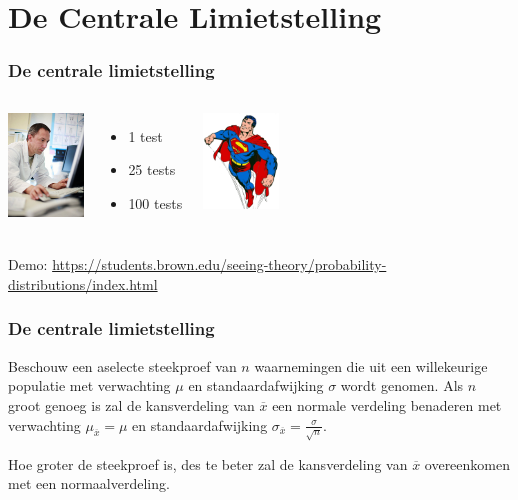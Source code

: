 \documentclass{beamer}
\begin{document}
\section{De Centrale Limietstelling}
\sectionframelogo{}


\begin{frame}
  \frametitle{De centrale limietstelling}


  \vfill

  \begin{columns}[c]
    \includegraphics[width=2cm]{img/les4-centrlimiet}
    \begin{itemize}
      \item 1 test
      \item 25 tests
      \item 100 tests
    \end{itemize}
    \includegraphics[width=2cm]{img/les2-hero-3}
  \end{columns}

\vfill
Demo: \url{https://students.brown.edu/seeing-theory/probability-distributions/index.html}

\end{frame}

\begin{frame}
  \frametitle{De centrale limietstelling}
  Beschouw een aselecte steekproef van $n$ waarnemingen die uit een willekeurige populatie met verwachting $\mu$ en standaardafwijking $\sigma$ wordt genomen. Als $n$ groot genoeg is zal de kansverdeling van $\overline{x}$ een normale verdeling benaderen met verwachting $\mu_{\overline{x}} = \mu$ en standaardafwijking $\sigma_{\overline{x}} = \frac{\sigma}{\sqrt{n}}$.

\vspace{0.4cm}
  Hoe groter de steekproef is, des te beter zal de kansverdeling van $\overline{x}$ overeenkomen met een normaalverdeling.
\end{frame}
\end{document}
